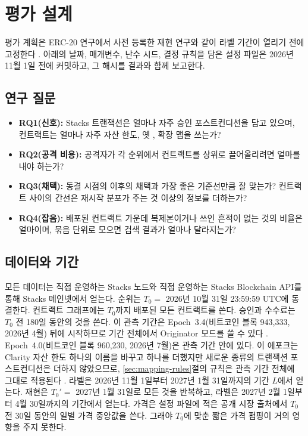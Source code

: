 \section{평가 설계}
\label{sec:evaluation}

평가 계획은 ERC-20 연구에서 사전 등록한 재현 연구와 같이 라벨 기간이 열리기 전에 고정한다 \cite{kwon2026endorserank}. 아래의 날짜, 매개변수, 난수 시드, 결정 규칙을 담은 설정 파일은 2026년 11월 1일 전에 커밋하고, 그 해시를 결과와 함께 보고한다.

\subsection{연구 질문}

\begin{itemize}
\item \textbf{RQ1(신호):} Stacks 트랜잭션은 얼마나 자주 승인 포스트컨디션을 담고 있으며, 컨트랙트는 얼마나 자주 자산 한도, 옛 , 확장 맵을 쓰는가?
\item \textbf{RQ2(공격 비용):} 공격자가 각 순위에서 컨트랙트를 상위로 끌어올리려면 얼마를 내야 하는가?
\item \textbf{RQ3(채택):} 동결 시점의  이후의 채택과 가장 좋은 기준선만큼 잘 맞는가? 컨트랙트 사이의 간선은 재시작 분포가 주는 것 이상의 정보를 더하는가?
\item \textbf{RQ4(잡음):} 배포된 컨트랙트 가운데 복제본이거나 쓰인 흔적이 없는 것의 비율은 얼마이며, 묶음 단위로 모으면 검색 결과가 얼마나 달라지는가?
\end{itemize}

\subsection{데이터와 기간}

모든 데이터는 직접 운영하는 Stacks 노드와 직접 운영하는 Stacks Blockchain API를 통해 Stacks 메인넷에서 얻는다. 순위는 $T_0=$ 2026년 10월 31일 23:59:59 UTC에 동결한다. 컨트랙트 그래프에는 $T_0$까지 배포된 모든 컨트랙트를 쓴다. 승인과 수수료는 $T_0$ 전 180일 동안의 것을 쓴다. 이 관측 기간은 Epoch~3.4(비트코인 블록 943,333, 2026년 4월) 뒤에 시작하므로 기간 전체에서 Originator 모드를 쓸 수 있다 \cite{sip039,sip040}. Epoch~4.0(비트코인 블록 960,230, 2026년 7월)은 관측 기간 안에 있다. 이 에포크는 Clarity 자산 한도 하나의 이름을 바꾸고 하나를 더했지만 새로운 종류의 트랜잭션 포스트컨디션은 더하지 않았으므로, \ref{sec:mapping-rules}절의 규칙은 관측 기간 전체에 그대로 적용된다 \cite{sip044}. 라벨은 2026년 11월 1일부터 2027년 1월 31일까지의 기간 $L$에서 얻는다. 재현은 $T_0'=$ 2027년 1월 31일로 모든 것을 반복하고, 라벨은 2027년 2월 1일부터 4월 30일까지의 기간에서 얻는다. 가격은 설정 파일에 적은 공개 시장 출처에서 $T_0$ 전 30일 동안의 일별 가격 중앙값을 쓴다. 그래야 $T_0$에 맞춘 짧은 가격 펌핑이 거의 영향을 주지 못한다.

